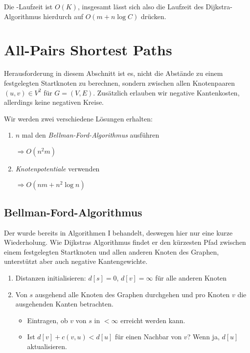 Die -Laufzeit ist \( O(K) \), insgesamt lässt sich also die Laufzeit des Dijkstra-Algorithmus hierdurch auf \( O(m + n\log C) \) drücken.

\section{All-Pairs Shortest Paths}

Herausforderung in diesem Abschnitt ist es, nicht die Abstände zu einem festgelegten Startknoten zu berechnen, sondern zwischen allen Knotenpaaren \( (u,v) \in V^2 \) für \( G = (V,E) \). Zusätzlich erlauben wir negative Kantenkosten, allerdings keine negativen Kreise.

Wir werden zwei verschiedene Lösungen erhalten:

\begin{enumerate}
  \item \( n \) mal den \emph{Bellman-Ford-Algorithmus} ausführen

  \( \Rightarrow O(n^2m) \)

  \item \emph{Knotenpotentiale} verwenden

  \( \Rightarrow O(nm + n^2\log n) \)
\end{enumerate}

\subsection{Bellman-Ford-Algorithmus}

Der  wurde bereits in Algorithmen I behandelt, deswegen hier nur eine kurze Wiederholung. Wie Dijkstras Algorithmus findet er den kürzesten Pfad zwischen einem festgelegten Startknoten und allen anderen Knoten des Graphen, unterstützt aber auch negative Kantengewichte.

\begin{enumerate}
  \item Distanzen initialisieren: \( d[s] = 0 \), \( d[v] = \infty \) für alle anderen Knoten
  \item Von \( s \) ausgehend alle Knoten des Graphen durchgehen und pro Knoten \( v \) die ausgehenden Kanten betrachten.
  \begin{itemize}
    \item Eintragen, ob \( v \) von \( s \) in \( < \infty \) erreicht werden kann.
    \item Ist \( d[v] + c(v,u) < d[u] \) für einen Nachbar von \( v \)? Wenn ja, \( d[u] \) aktualisieren.
  \end{itemize}
\end{enumerate}

